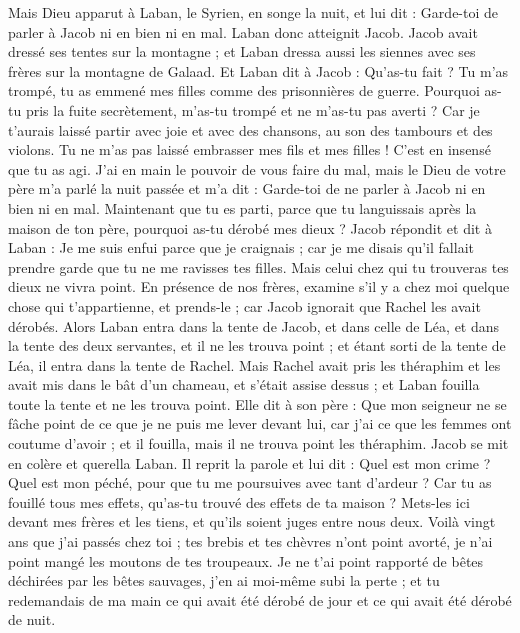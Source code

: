 \begin{multicols}{2}
Mais Dieu apparut à Laban, le Syrien, en songe la nuit, et lui dit : Garde-toi de parler à Jacob ni en bien ni en mal.
Laban donc atteignit Jacob. Jacob avait dressé ses tentes sur la montagne ; et Laban dressa aussi les siennes avec ses frères sur la montagne de Galaad.
Et Laban dit à Jacob : Qu'as-tu fait ? Tu m'as trompé, tu as emmené mes filles comme des prisonnières de guerre.
Pourquoi as-tu pris la fuite secrètement, m'as-tu trompé et ne m'as-tu pas averti ? Car je t'aurais laissé partir avec joie et avec des chansons, au son des tambours et des violons.
Tu ne m'as pas laissé embrasser mes fils et mes filles ! C'est en insensé que tu as agi.
J'ai en main le pouvoir de vous faire du mal, mais le Dieu de votre père m'a parlé la nuit passée et m'a dit : Garde-toi de ne parler à Jacob ni en bien ni en mal.
Maintenant que tu es parti, parce que tu languissais après la maison de ton père, pourquoi as-tu dérobé mes dieux ?
Jacob répondit et dit à Laban : Je me suis enfui parce que je craignais ; car je me disais qu'il fallait prendre garde que tu ne me ravisses tes filles.
Mais celui chez qui tu trouveras tes dieux ne vivra point. En présence de nos frères, examine s'il y a chez moi quelque chose qui t'appartienne, et prends-le ; car Jacob ignorait que Rachel les avait dérobés.
Alors Laban entra dans la tente de Jacob, et dans celle de Léa, et dans la tente des deux servantes, et il ne les trouva point ; et étant sorti de la tente de Léa, il entra dans la tente de Rachel.
Mais Rachel avait pris les théraphim et les avait mis dans le bât d'un chameau, et s'était assise dessus ; et Laban fouilla toute la tente et ne les trouva point.
Elle dit à son père : Que mon seigneur ne se fâche point de ce que je ne puis me lever devant lui, car j'ai ce que les femmes ont coutume d'avoir ; et il fouilla, mais il ne trouva point les théraphim.
Jacob se mit en colère et querella Laban. Il reprit la parole et lui dit : Quel est mon crime ? Quel est mon péché, pour que tu me poursuives avec tant d'ardeur ?
Car tu as fouillé tous mes effets, qu'as-tu trouvé des effets de ta maison ? Mets-les ici devant mes frères et les tiens, et qu'ils soient juges entre nous deux.
Voilà vingt ans que j'ai passés chez toi ; tes brebis et tes chèvres n'ont point avorté, je n'ai point mangé les moutons de tes troupeaux.
Je ne t'ai point rapporté de bêtes déchirées par les bêtes sauvages, j'en ai moi-même subi la perte ; et tu redemandais de ma main ce qui avait été dérobé de jour et ce qui avait été dérobé de nuit.

\end{multicols}

